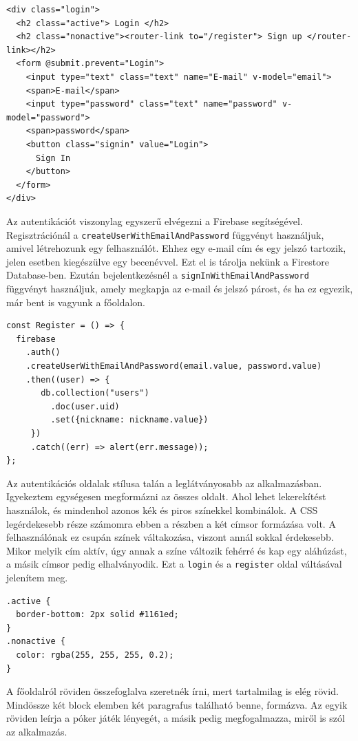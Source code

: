 \begin{lstlisting}[style=htmlcssjs]
<div class="login">
  <h2 class="active"> Login </h2>
  <h2 class="nonactive"><router-link to="/register"> Sign up </router-link></h2> 
  <form @submit.prevent="Login">
    <input type="text" class="text" name="E-mail" v-model="email">
    <span>E-mail</span>
    <input type="password" class="text" name="password" v-model="password">
    <span>password</span>
    <button class="signin" value="Login">
      Sign In
    </button>
  </form>
</div>
\end{lstlisting}

Az autentikációt viszonylag egyszerű elvégezni a Firebase segítségével. Regisztrációnál a \texttt{createUserWithEmailAndPassword} függvényt használjuk, amivel létrehozunk egy felhasználót. Ehhez egy e-mail cím és egy jelszó tartozik, jelen esetben kiegészülve egy becenévvel. Ezt el is tárolja nekünk a Firestore Database-ben. Ezután bejelentkezésnél a \texttt{signInWithEmailAndPassword} függvényt használjuk, amely megkapja az e-mail és jelszó párost, és ha ez egyezik, már bent is vagyunk a főoldalon.

\begin{lstlisting}[style=htmlcssjs]
const Register = () => {
  firebase
    .auth()
    .createUserWithEmailAndPassword(email.value, password.value)
    .then((user) => {
       db.collection("users")
         .doc(user.uid)
         .set({nickname: nickname.value})
     })
     .catch((err) => alert(err.message));
};
\end{lstlisting}

Az autentikációs oldalak stílusa talán a leglátványosabb az alkalmazásban. Igyekeztem egységesen megformázni az összes oldalt. Ahol lehet lekerekítést használok, és mindenhol azonos kék és piros színekkel kombinálok. A CSS legérdekesebb része számomra ebben a részben a két címsor formázása volt. A felhasználónak ez csupán színek váltakozása, viszont annál sokkal érdekesebb. Mikor melyik cím aktív, úgy annak a színe változik fehérré és kap egy aláhúzást, a másik címsor pedig elhalványodik. Ezt a \texttt{login} és a \texttt{register} oldal váltásával jelenítem meg.

\begin{lstlisting}[style=htmlcssjs]
.active {
  border-bottom: 2px solid #1161ed;
}
.nonactive {
  color: rgba(255, 255, 255, 0.2);
}
\end{lstlisting}


A főoldalról röviden összefoglalva szeretnék írni, mert tartalmilag is elég rövid. Mindössze két block elemben két paragrafus található benne, formázva. Az egyik röviden leírja a póker játék lényegét, a másik pedig megfogalmazza, miről is szól az alkalmazás.

